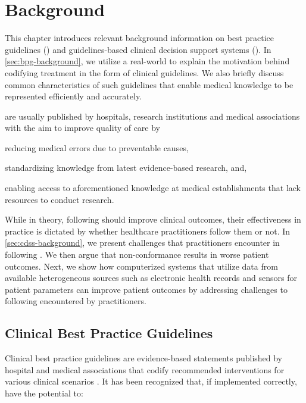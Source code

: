 \chapter{Background}\label{chapter:background}

This chapter introduces relevant background information on
best practice guidelines (\BPG{}) and guidelines-based clinical decision support
systems (\CDSS{}).
In \autoref{sec:bpg-background}, we utilize a real-world \BPG{}
to explain the motivation behind codifying treatment
in the form of clinical guidelines. We also briefly discuss
common characteristics of such guidelines that enable medical knowledge
to be represented efficiently and accurately.

\BPGs{} are usually published by hospitals,
research institutions and medical associations with the aim to improve quality of care by
\begin{enumerate*}[label=(\alph*)]
  \item reducing medical errors due to preventable causes,
  \item standardizing knowledge from latest evidence-based research, and,
  \item enabling access to aforementioned knowledge at medical establishments
  that lack resources to conduct research.
\end{enumerate*}

While in theory, following \BPGs{} should improve clinical outcomes,
their effectiveness in practice is dictated by whether healthcare practitioners
follow them or not. In \autoref{sec:cdss-background}, we present
challenges that practitioners encounter in following \BPGs{}. We then argue
that non-conformance results in worse patient outcomes.
Next, we show how computerized systems that utilize data from available
heterogeneous sources such as electronic health records and sensors for
patient parameters can improve patient outcomes by addressing challenges
to following \BPGs{} encountered by practitioners.

\section{Clinical Best Practice Guidelines}\label{sec:bpg-background}

Clinical best practice guidelines are evidence-based statements
published by hospital and medical associations that codify recommended
interventions for various clinical scenarios \cite{field1990clinical}.
It has been recognized that, if implemented correctly, \BPGs{} have the potential to:

